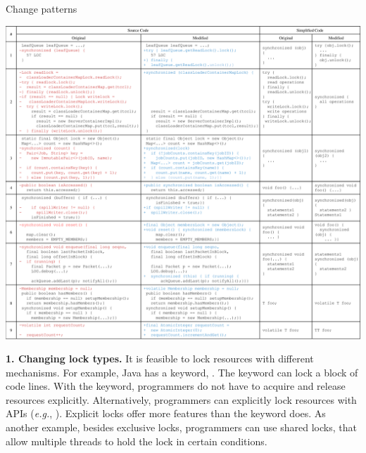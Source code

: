 \begin{table}
	\centering
\caption{Change patterns}\vspace*{-1ex}
	\includegraphics[width=1\textwidth]{patterns}	
	\label{table:patterns}\vspace*{-3ex}
\end{table}

\noindent
\textbf{1. Changing lock types.} It is feasible to lock resources with different mechanisms. For example, Java has a keyword, . The keyword can lock a block of code lines. With the keyword, programmers do not have to acquire and release resources explicitly. Alternatively, programmers can explicitly lock resources with APIs (\emph{e.g.}, ). Explicit locks offer more features than the  keyword does. As another example, besides exclusive locks, programmers can use shared locks, that allow multiple threads to hold the lock in certain conditions.


